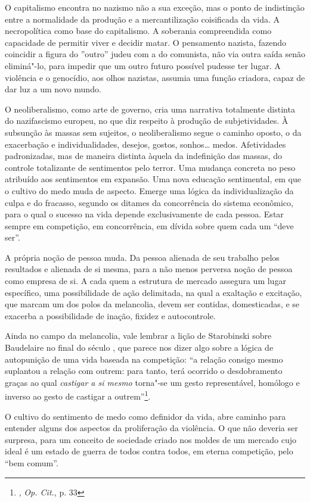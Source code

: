 O capitalismo encontra no nazismo não a sua exceção, mas o ponto de
indistinção entre a normalidade da produção e a mercantilização
coisificada da vida. A necropolítica como base do capitalismo. A
soberania compreendida como capacidade de permitir viver e decidir
matar. O pensamento nazista, fazendo coincidir a figura do ''outro''
judeu com a do comunista, não via outra saída senão eliminá"-lo, para
impedir que um outro futuro possível pudesse ter lugar. A violência e o
genocídio, aos olhos nazistas, assumia uma função criadora, capaz de dar
luz a um novo mundo.

\asterisc

O neoliberalismo, como arte de governo, cria uma narrativa totalmente
distinta do nazifascismo europeu, no que diz respeito à produção de
subjetividades. À subsunção às massas sem sujeitos, o neoliberalismo
segue o caminho oposto, o da exacerbação e individualidades, desejos,
gostos, sonhos\ldots{} medos. Afetividades padronizadas, mas de maneira
distinta àquela da indefinição das massas, do controle totalizante de
sentimentos pelo terror. Uma mudança concreta no peso atribuído aos
sentimentos em expansão. Uma nova educação sentimental, em que o cultivo
do medo muda de aspecto. Emerge uma lógica da individualização da culpa
e do fracasso, segundo os ditames da concorrência do sistema econômico,
para o qual o sucesso na vida depende exclusivamente de cada pessoa.
Estar sempre em competição, em concorrência, em dívida sobre quem cada
um ``deve ser''.

A própria noção de pessoa muda. Da pessoa alienada de seu trabalho pelos
resultados e alienada de si mesma, para a não menos perversa noção de
pessoa como empresa de si. A cada quem a estrutura de mercado assegura
um lugar específico, uma possibilidade de ação delimitada, na qual a
exaltação e excitação, que marcam um dos polos da melancolia, devem ser
contidas, domesticadas, e se exacerba a possibilidade de inação, fixidez
e autocontrole.

Ainda no campo da melancolia, vale lembrar a lição de Starobinski sobre
Baudelaire no final do século , que parece nos dizer algo sobre a
lógica de autopunição de uma vida baseada na competição: ``a relação
consigo mesmo suplantou a relação com outrem: para tanto, terá ocorrido
o desdobramento graças ao qual \emph{castigar a si mesmo} torna"-se um
gesto representável, homólogo e inverso ao gesto de castigar a
outrem''\footnote{, \emph{Op. Cit.}, p. 33}.

O cultivo do sentimento de medo como definidor da vida, abre caminho
para entender alguns dos aspectos da proliferação da violência. O que
não deveria ser surpresa, para um conceito de sociedade criado nos
moldes de um mercado cujo ideal é um estado de guerra de todos contra
todos, em eterna competição, pelo ``bem comum''.

